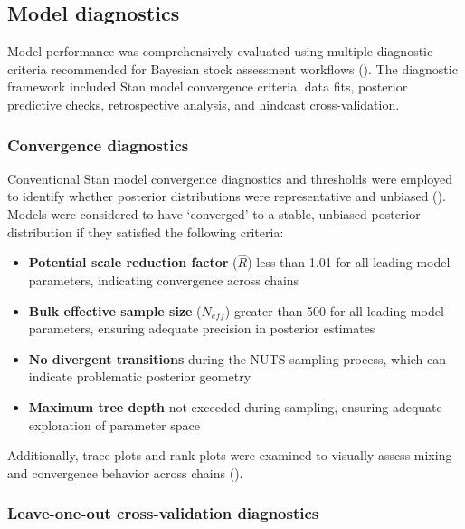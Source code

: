 \documentclass[
  11pt,
]{SCreport}
\providecommand{\tightlist}{%
  \setlength{\itemsep}{0pt}\setlength{\parskip}{0pt}}\usepackage{longtable,booktabs,array}
\begin{document}
\subsection{Model diagnostics}\label{sec-model-diagnostics}

Model performance was comprehensively evaluated using multiple
diagnostic criteria recommended for Bayesian stock assessment workflows
(). The diagnostic
framework included Stan model convergence criteria, data fits, posterior
predictive checks, retrospective analysis, and hindcast
cross-validation.

\subsubsection{Convergence
diagnostics}\label{sec-convergence-diagnostics}

Conventional Stan model convergence diagnostics and thresholds were
employed to identify whether posterior distributions were representative
and unbiased ().
Models were considered to have `converged' to a stable, unbiased
posterior distribution if they satisfied the following criteria:

\begin{itemize}
\tightlist
\item
  \textbf{Potential scale reduction factor} (\(\hat{R}\)) less than 1.01
  for all leading model parameters, indicating convergence across chains
\item
  \textbf{Bulk effective sample size} (\(N_{eff}\)) greater than 500 for
  all leading model parameters, ensuring adequate precision in posterior
  estimates\\
\item
  \textbf{No divergent transitions} during the NUTS sampling process,
  which can indicate problematic posterior geometry
\item
  \textbf{Maximum tree depth} not exceeded during sampling, ensuring
  adequate exploration of parameter space
\end{itemize}

Additionally, trace plots and rank plots were examined to visually
assess mixing and convergence behavior across chains
().

\subsubsection{Leave-one-out cross-validation
diagnostics}\label{sec-loo-diagnostics}
\end{document}
